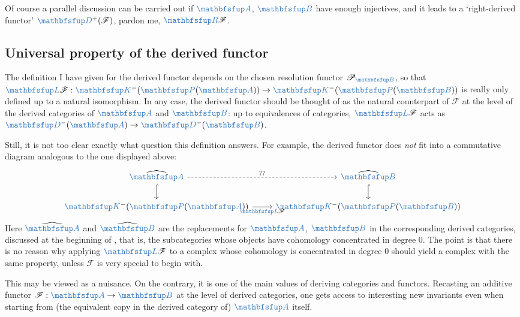 Of course a parallel discussion can be carried out if $\categ{A}$,
$\categ{B}$ have enough injectives, and it leads to a `right-derived
functor' $\categ{D}^+(\mathscr{F})$, pardon me,
$\categ{R}\mathscr{F}$.

\subsection{Universal property of the derived functor}
\label{subsec:homol:universal-property-of-the-derived-functor}

The definition I have given for the derived functor depends on the
chosen resolution functor $\mathscr{P}_{\categ{B}}$, so that
$\categ{L}\mathscr{F} : \categ{K}^-(\categ{P}(\categ{A})) \to
\categ{K}^-(\categ{P}(\categ{B}))$ is really only defined up to a
natural isomorphism. In any case, the derived functor should be
thought of as the natural counterpart of $\mathscr{F}$ at the level of
the derived categories of $\categ{A}$ and $\categ{B}$: up to
equivalences of categories, $\categ{L}\mathscr{F}$ acts as
$\categ{D}^-(\categ{A}) \to \categ{D}^-(\categ{B})$.

Still, it is not too clear exactly what question this definition
answers. For example, the derived functor does \emph{not} fit into a
commutative diagram analogous to the one displayed above:
\[\begin{tikzcd}
    \widehat{\categ{A}} \arrow[r, dashed, "??"] \arrow[d, hook] &
    \widehat{\categ{B}} \arrow[d, hook] \\
    \categ{K}^-(\categ{P}(\categ{A})) \arrow[r,
    "\categ{L}\mathscr{F}"'] & \categ{K}^-(\categ{P}(\categ{B}))
  \end{tikzcd}\] Here $\widehat{\categ{A}}$ and $\widehat{\categ{B}}$
are the replacements for $\categ{A}$, $\categ{B}$ in the corresponding
derived categories, discussed at the beginning of
, that is, the subcategories
whose objects have cohomology concentrated in degree $0$. The point is
that there is no reason why applying $\categ{L}\mathscr{F}$ to a
complex whose cohomology is concentrated in degree $0$ should yield a
complex with the same property, unless $\mathscr{F}$ is very special
to begin with.

This may be viewed as a nuisance. On the contrary, it is one of the
main values of deriving categories and functors. Recasting an additive
functor $\mathscr{F} : \categ{A} \to \categ{B}$ at the level of
derived categories, one gets access to interesting new invariants even
when starting from (the equivalent copy in the derived category of)
$\categ{A}$ itself.

